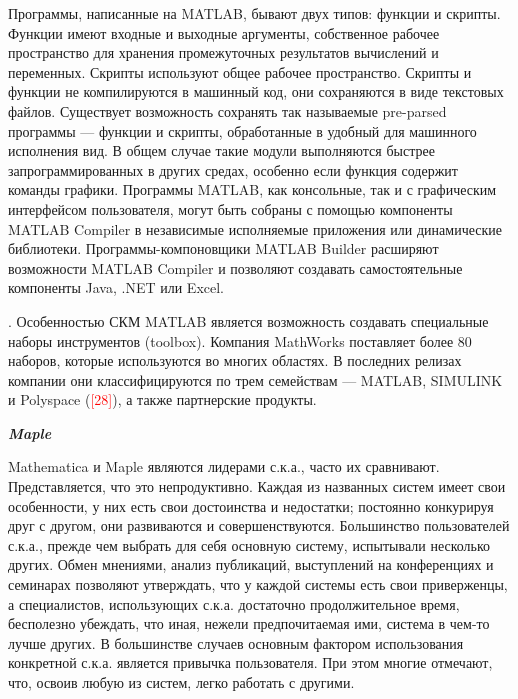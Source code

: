 Программы, написанные на MATLAB, бывают двух типов: функции и скрипты. Функции имеют входные и выходные аргументы, собственное рабочее пространство для хранения промежуточных результатов вычислений и переменных. Скрипты используют общее рабочее пространство. Скрипты и функции не компилируются в машинный код, они сохраняются в виде текстовых файлов. Существует возможность сохранять так называемые pre-parsed программы --- функции и скрипты, обработанные в удобный для машинного исполнения вид. В общем случае такие модули выполняются быстрее запрограммированных в других средах, особенно если функция содержит команды графики.
Программы MATLAB, как консольные, так и с графическим интерфейсом пользователя, могут быть собраны с помощью компоненты MATLAB Compiler в независимые исполняемые приложения или динамические библиотеки. Программы-компоновщики MATLAB Builder расширяют возможности MATLAB Compiler и позволяют создавать самостоятельные компоненты Java, .NET или Excel.

.
Особенностью СКМ MATLAB является возможность создавать специальные наборы инструментов (toolbox). Компания MathWorks поставляет более 80 наборов, которые используются во многих областях. В последних релизах компании они классифицируются по трем семействам --- MATLAB, SIMULINK и Polyspace (\textcolor{red}{[28]}), а также партнерские продукты.

\textbf{\textit{Maple}}

Mathematica и Maple являются лидерами с.к.а., часто их сравнивают. Представляется, что это непродуктивно. Каждая из названных систем имеет свои особенности, у них есть свои достоинства и недостатки; постоянно конкурируя друг с другом, они развиваются и совершенствуются. Большинство пользователей с.к.а., прежде чем выбрать для себя основную систему, испытывали несколько других. Обмен мнениями, анализ публикаций, выступлений на конференциях и семинарах позволяют утверждать, что у каждой системы есть свои приверженцы, а специалистов, использующих с.к.а. достаточно продолжительное время, бесполезно убеждать, что иная, нежели предпочитаемая ими, система в чем-то лучше других. В большинстве случаев основным фактором использования конкретной с.к.а. является привычка пользователя. При этом многие отмечают, что, освоив любую из систем, легко работать с другими.

